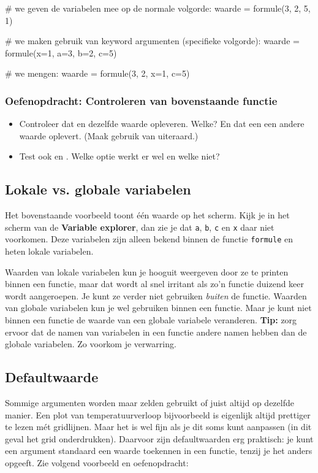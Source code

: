 \documentclass[a4paper,11pt, fleqn]{article}
\begin{document}
\begin{python}
	# we geven de variabelen mee op de normale volgorde:
	waarde = formule(3, 2, 5, 1)
	
	# we maken gebruik van keyword argumenten (specifieke volgorde):
	waarde = formule(x=1, a=3, b=2, c=5)
	
	# we mengen:
	waarde = formule(3, 2, x=1, c=5)
\end{python}

\subsubsection*{Oefenopdracht: Controleren van bovenstaande functie}
\begin{itemize}
	\item Controleer dat  en   dezelfde waarde opleveren. Welke? En dat een  een andere waarde oplevert. (Maak gebruik van  uiteraard.)
	\item Test ook  en . Welke optie werkt er wel en welke niet?
\end{itemize}

\subsection{Lokale vs. globale variabelen}
Het bovenstaande voorbeeld toont \'e\'en waarde op het scherm. Kijk je in het scherm van de \textbf{Variable explorer}, dan zie je dat \verb.a., \verb.b., \verb.c. en \verb.x. daar niet voorkomen. Deze variabelen zijn alleen bekend binnen de functie \verb.formule. en heten lokale variabelen. 

Waarden van lokale variabelen kun je hooguit weergeven door ze te printen binnen een functie, maar dat wordt al snel irritant als zo'n functie duizend keer wordt aangeroepen. Je kunt ze verder niet gebruiken {\it buiten} de functie. Waarden van globale variabelen kun je wel gebruiken binnen een functie. Maar je kunt niet binnen een functie de waarde van een globale variabele veranderen. {\bf Tip:} zorg ervoor dat de namen van variabelen in een functie andere namen hebben dan de globale variabelen. Zo voorkom je verwarring.

\subsection{Defaultwaarde}
Sommige argumenten worden maar zelden gebruikt of juist altijd op dezelfde manier. Een plot van temperatuurverloop bijvoorbeeld is eigenlijk altijd prettiger te lezen m\'et gridlijnen. Maar het is wel fijn als je dit soms kunt aanpassen (in dit geval het grid onderdrukken). Daarvoor zijn defaultwaarden erg praktisch: je kunt een argument standaard een waarde toekennen in een functie, tenzij je het anders opgeeft. Zie volgend voorbeeld en oefenopdracht:
\end{document}
